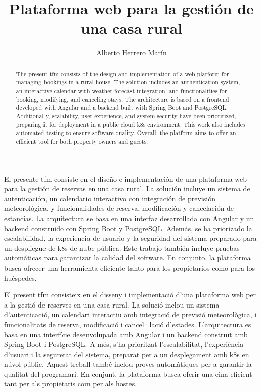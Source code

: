 \documentclass[twoside,english,a4paper,12pt]{plantilla/twcam-tfm-doc}
\title{Plataforma web para la gestión de una casa rural}
\author{Alberto Herrero Marín}
\begin{document}
\portada

\cleardoublepage
\declaracion
\cleardoublepage


\begin{resumen}
  El presente \gls{tfm} consiste en el diseño e implementación de una plataforma web para la gestión de reservas en una casa rural. La solución incluye un sistema de autenticación, un calendario interactivo con integración de previsión meteorológica, y funcionalidades de reserva, modificación y cancelación de estancias. La arquitectura se basa en una interfaz desarrollada con Angular y un backend construido con Spring Boot y PostgreSQL. Además, se ha priorizado la escalabilidad, la experiencia de usuario y la seguridad del sistema preparado para un despliegue de \gls{k8s} de nube pública. Este trabajo también incluye pruebas automáticas para garantizar la calidad del software. En conjunto, la plataforma busca ofrecer una herramienta eficiente tanto para los propietarios como para los huéspedes.
\end{resumen}
\cleardoublepage

\begin{abstract}
  The present \gls{tfm} consists of the design and implementation of a web platform for managing bookings in a rural house. The solution includes an authentication system, an interactive calendar with weather forecast integration, and functionalities for booking, modifying, and canceling stays. The architecture is based on a frontend developed with Angular and a backend built with Spring Boot and PostgreSQL. Additionally, scalability, user experience, and system security have been prioritized, preparing it for deployment in a public cloud \gls{k8s} environment. This work also includes automated testing to ensure software quality. Overall, the platform aims to offer an efficient tool for both property owners and guests.
\end{abstract}
\cleardoublepage

\begin{resum}
 El present \gls{tfm} consisteix en el disseny i implementació d'una plataforma web per a la gestió de reserves en una casa rural. La solució inclou un sistema d'autenticació, un calendari interactiu amb integració de previsió meteorològica, i funcionalitats de reserva, modificació i cancel·lació d'estades. L'arquitectura es basa en una interfície desenvolupada amb Angular i un backend construït amb Spring Boot i PostgreSQL. A més, s'ha prioritzat l'escalabilitat, l'experiència d'usuari i la seguretat del sistema, preparat per a un desplegament amb \gls{k8s} en núvol públic. Aquest treball també inclou proves automàtiques per a garantir la qualitat del programari. En conjunt, la plataforma busca oferir una eina eficient tant per als propietaris com per als hostes.
\end{resum}
\cleardoublepage
\end{document}
